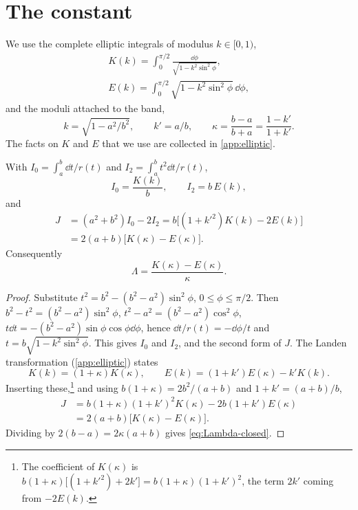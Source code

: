 \section{The constant}\label{sec:constant}

We use the complete elliptic integrals of modulus $k\in[0,1)$,
\begin{gather*}
K(k)=\int_0^{\pi/2}\frac{\dd\phi}{\sqrt{1-k^2\sin^2\phi}},\\
E(k)=\int_0^{\pi/2}\sqrt{1-k^2\sin^2\phi}\,\dd\phi ,
\end{gather*}
and the moduli attached to the band,
\[
k=\sqrt{1-a^2/b^2},\qquad k'=a/b,\qquad
\kappa=\frac{b-a}{b+a}=\frac{1-k'}{1+k'} .
\]
The facts on $K$ and $E$ that we use are collected in \cref{app:elliptic}.

\begin{proposition}\label{prop:J}
With $I_0=\int_a^b\dd t/r(t)$ and $I_2=\int_a^bt^2\dd t/r(t)$,
\[
I_0=\frac{K(k)}b,\qquad I_2=b\,E(k),
\]
and
\begin{equation}\label{eq:J}
\begin{aligned}
J&=(a^2+b^2)I_0-2I_2=b\big[(1+k'^2)K(k)-2E(k)\big]\\
&=2(a+b)\big[K(\kappa)-E(\kappa)\big].
\end{aligned}
\end{equation}
Consequently
\begin{equation}\label{eq:Lambda-closed}
\Lambda=\frac{K(\kappa)-E(\kappa)}{\kappa}.
\end{equation}
\end{proposition}

\begin{proof}
Substitute $t^2=b^2-(b^2-a^2)\sin^2\phi$, $0\le\phi\le\pi/2$. Then
$b^2-t^2=(b^2-a^2)\sin^2\phi$, $t^2-a^2=(b^2-a^2)\cos^2\phi$,
$t\dd t=-(b^2-a^2)\sin\phi\cos\phi\dd\phi$, hence $\dd t/r(t)=-\dd\phi/t$ and
$t=b\sqrt{1-k^2\sin^2\phi}$. This gives $I_0$ and $I_2$, and the second form of
$J$. The Landen transformation (\cref{app:elliptic}) states
\[
K(k)=(1+\kappa)K(\kappa),\qquad E(k)=(1+k')E(\kappa)-k'K(k).
\]
Inserting these,\footnote{The coefficient of $K(\kappa)$ is $b(1+\kappa)\big[(1+k'^2)+2k'\big]=b(1+\kappa)(1+k')^2$, the term $2k'$ coming from $-2E(k)$.} and using $b(1+\kappa)=2b^2/(a+b)$ and $1+k'=(a+b)/b$,
\begin{align*}
J&=b(1+\kappa)(1+k')^2K(\kappa)-2b(1+k')E(\kappa)\\
&=2(a+b)\big[K(\kappa)-E(\kappa)\big].
\end{align*}
Dividing by $2(b-a)=2\kappa(a+b)$ gives \eqref{eq:Lambda-closed}.
\end{proof}

